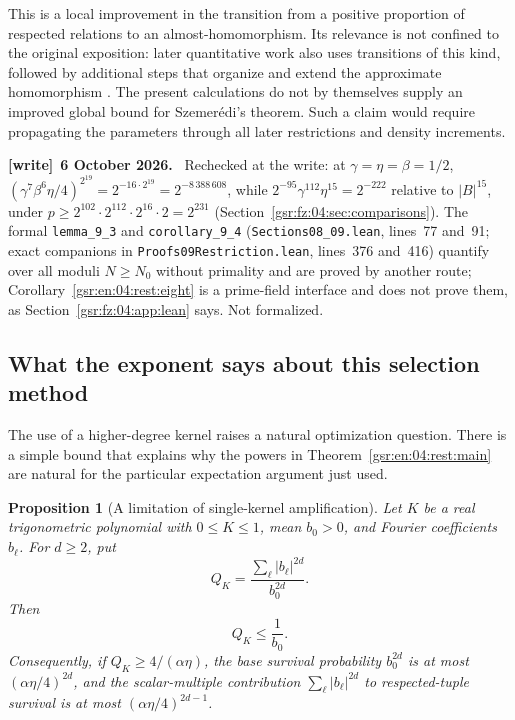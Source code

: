 \documentclass[11pt,letterpaper]{article}
\numberwithin{equation}{section}
\newtheorem{proposition}[theorem]{Proposition}
\theoremstyle{definition}
\theoremstyle{remark}
\newcommand{\1}{\mathbf 1}
\newcommand{\abs}[1]{\left|#1\right|}
\newcommand{\file}[1]{\nolinkurl{#1}}
\newenvironment{writenote}[1][]{\par\smallskip\begingroup\small
 \noindent\textbf{[write]}\if\relax\detokenize{#1}\relax\else~\textbf{#1.}\fi\ }%
 {\par\endgroup\smallskip}
\begin{document}
This is a local improvement in the transition from a positive
proportion of respected relations to an almost-homomorphism.
Its relevance is not confined to the original exposition:
later quantitative work also uses transitions of this kind,
followed by additional steps that organize and extend the
approximate homomorphism \cite{greentaofour}.
The present calculations do not by themselves supply an improved
global bound for Szemer\'edi's theorem.  Such a claim would
require propagating the parameters through all later
restrictions and density increments.
\begin{writenote}[6 October 2026]
Rechecked at the write: at $\gamma=\eta=\beta=1/2$, $(\gamma^7\beta^6\eta/4)^{2^{19}}=2^{-16\cdot2^{19}}=2^{-8\,388\,608}$, while $2^{-95}\gamma^{112}\eta^{15}=2^{-222}$ relative to $|B|^{15}$, under $p\ge2^{102}\cdot2^{112}\cdot2^{16}\cdot2=2^{231}$ (Section~\ref{gsr:fz:04:sec:comparisons}). The formal \file{lemma_9_3} and \file{corollary_9_4} (\file{Sections08\_09.lean}, lines~77 and~91; exact companions in \file{Proofs09Restriction.lean}, lines~376 and~416) quantify over all moduli $N\ge N_0$ without primality and are proved by another route; Corollary~\ref{gsr:en:04:rest:eight} is a prime-field interface and does not prove them, as Section~\ref{gsr:fz:04:app:lean} says. Not formalized.
\end{writenote}

\subsection{What the exponent says about this selection method}

The use of a higher-degree kernel raises a natural optimization
question.  There is a simple bound that explains why the powers
in Theorem~\ref{gsr:en:04:rest:main} are natural for the particular
expectation argument just used.

\begin{proposition}[A limitation of single-kernel amplification]
\label{gsr:en:04:rest:method-bound}
Let \(K\) be a real trigonometric polynomial with \(0\leq K\leq1\),
mean \(b_0>0\), and Fourier coefficients \(b_\ell\).  For
\(d\geq2\), put
\[
 Q_K=\frac{\sum_\ell\abs{b_\ell}^{2d}}{b_0^{2d}}.
\]
Then
\[
 Q_K\leq\frac1{b_0}.
 \tag{R32}
\]
Consequently, if \(Q_K\geq4/(\alpha\eta)\), the base survival
probability \(b_0^{2d}\) is at most
\((\alpha\eta/4)^{2d}\), and the scalar-multiple contribution
\(\sum_\ell\abs{b_\ell}^{2d}\) to respected-tuple survival is at most
\((\alpha\eta/4)^{2d-1}\).
\end{proposition}
\end{document}
